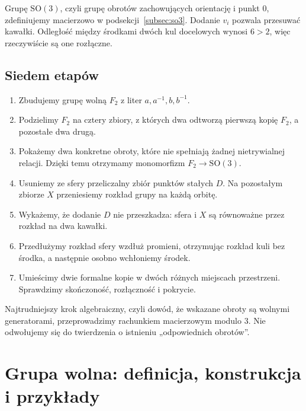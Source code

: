 \documentclass[11pt,a4paper]{article}
\numberwithin{equation}{section}
\theoremstyle{plain}
\theoremstyle{definition}
\theoremstyle{remark}
\begin{document}
Grupę $\mathrm{SO}(3)$, czyli grupę obrotów zachowujących orientację i punkt $0$, zdefiniujemy macierzowo w podsekcji~\ref{subsec:so3}. Dodanie $v_i$ pozwala przesuwać kawałki. Odległość między środkami dwóch kul docelowych wynosi $6>2$, więc rzeczywiście są one rozłączne.

\subsection{Siedem etapów}
\begin{enumerate}
\item Zbudujemy grupę wolną $F_2$ z liter $a,a^{-1},b,b^{-1}$.
\item Podzielimy $F_2$ na cztery zbiory, z których dwa odtworzą pierwszą kopię $F_2$, a pozostałe dwa drugą.
\item Pokażemy dwa konkretne obroty, które nie spełniają żadnej nietrywialnej relacji. Dzięki temu otrzymamy monomorfizm $F_2\to\mathrm{SO}(3)$.
\item Usuniemy ze sfery przeliczalny zbiór punktów stałych $D$. Na pozostałym zbiorze $X$ przeniesiemy rozkład grupy na każdą orbitę.
\item Wykażemy, że dodanie $D$ nie przeszkadza: sfera i $X$ są równoważne przez rozkład na dwa kawałki.
\item Przedłużymy rozkład sfery wzdłuż promieni, otrzymując rozkład kuli bez środka, a następnie osobno wchłoniemy środek.
\item Umieścimy dwie formalne kopie w dwóch różnych miejscach przestrzeni. Sprawdzimy skończoność, rozłączność i pokrycie.
\end{enumerate}
Najtrudniejszy krok algebraiczny, czyli dowód, że wskazane obroty są wolnymi generatorami, przeprowadzimy rachunkiem macierzowym modulo $3$. Nie odwołujemy się do twierdzenia o istnieniu „odpowiednich obrotów”.

\section{Grupa wolna: definicja, konstrukcja i przykłady}
\end{document}
